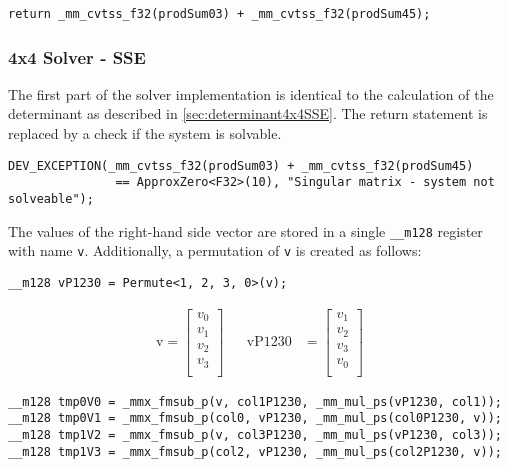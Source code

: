 \documentclass[]{scrartcl}
\begin{document}
\begin{verbatim}
return _mm_cvtss_f32(prodSum03) + _mm_cvtss_f32(prodSum45);
\end{verbatim}


\subsubsection{4x4 Solver - SSE}

The first part of the solver implementation is identical to the calculation of the determinant as described in \cref{sec:determinant4x4SSE}. The return statement is replaced by a check if the system is solvable.

\begin{verbatim}
DEV_EXCEPTION(_mm_cvtss_f32(prodSum03) + _mm_cvtss_f32(prodSum45) 
               == ApproxZero<F32>(10), "Singular matrix - system not solveable");
\end{verbatim} 

The values of the right-hand side vector are stored in a single \texttt{__m128} register with name \texttt{v}. Additionally, a permutation of \texttt{v} is created as follows:

\begin{verbatim}
__m128 vP1230 = Permute<1, 2, 3, 0>(v);
\end{verbatim}


\begin{align*}
\mathrm{v} 
=
\begin{bmatrix}
v_0\\
v_1\\
v_2\\
v_3\\
\end{bmatrix}
&&
\mathrm{vP1230} 
&=
\begin{bmatrix}
v_1\\
v_2\\
v_3\\
v_0\\
\end{bmatrix}
\end{align*}


\begin{verbatim}
__m128 tmp0V0 = _mmx_fmsub_p(v, col1P1230, _mm_mul_ps(vP1230, col1));
__m128 tmp0V1 = _mmx_fmsub_p(col0, vP1230, _mm_mul_ps(col0P1230, v));
__m128 tmp1V2 = _mmx_fmsub_p(v, col3P1230, _mm_mul_ps(vP1230, col3));
__m128 tmp1V3 = _mmx_fmsub_p(col2, vP1230, _mm_mul_ps(col2P1230, v));
\end{verbatim}
\end{document}

